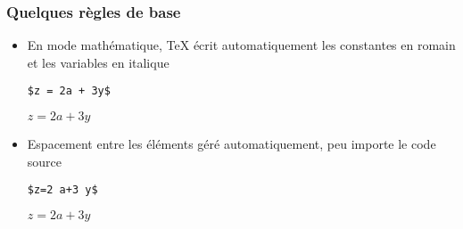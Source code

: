 \begin{frame}[plain]
\end{frame}

\begin{frame}[fragile]
  \frametitle{Quelques règles de base}
  \begin{itemize}
  \item En mode mathématique, {\TeX} écrit automatiquement les
    constantes en romain et les variables en italique
    \begin{demo}
      \begin{texample}
\begin{lstlisting}
$z = 2a + 3y$
\end{lstlisting}
        \producing
        $z = 2a + 3y$
      \end{texample}
    \end{demo}
  \item Espacement entre les éléments géré automatiquement, peu importe
    le code source
    \begin{demo}
      \begin{texample}
\begin{lstlisting}
$z=2 a+3 y$
\end{lstlisting}
        \producing
        $z=2 a+3 y$
      \end{texample}
    \end{demo}
  \end{itemize}
\end{frame}

